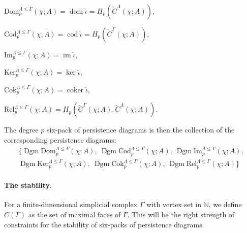 \documentclass[8pt,a4paper,oneside,english,english]{article}
\theoremstyle{plain}
\theoremstyle
{plain}
\theoremstyle{definition}
\newcommand{\N}{\mathbb{N}}
\newcommand{\sixPackPersistenceModule}[6]{{#6}_{#5}^{{#3}\leq{#4}}({#2};{#1})}
\newcommand{\Dom}[5]{\sixPackPersistenceModule{#1}{#2}{#3}{#4}{#5}{\mathrm{Dom}}}
\newcommand{\Cod}[5]{\sixPackPersistenceModule{#1}{#2}{#3}{#4}{#5}{\mathrm{Cod}}}
\newcommand{\Img}[5]{\sixPackPersistenceModule{#1}{#2}{#3}{#4}{#5}{\mathrm{Im}}}
\newcommand{\Ker}[5]{\sixPackPersistenceModule{#1}{#2}{#3}{#4}{#5}{\mathrm{Ker}}}
\newcommand{\Cok}[5]{\sixPackPersistenceModule{#1}{#2}{#3}{#4}{#5}{\mathrm{Cok}}}
\newcommand{\Rel}[5]{\sixPackPersistenceModule{#1}{#2}{#3}{#4}{#5}{\mathrm{Rel}}}
\DeclareMathOperator{\im}{im}
\DeclareMathOperator{\dom}{dom}
\DeclareMathOperator{\codom}{cod}
\DeclareMathOperator{\coker}{coker}
\DeclareMathOperator{\Dgm}{Dgm}
\begin{document}
\smallskip
\begin{compactenum}[-]
    \item $\Dom{A}{\chi}{\Lambda}{\Gamma}{p} = \dom \hat\iota = H_p(\check{C}^\Lambda(\chi; A))$,

    \item $\Cod{A}{\chi}{\Lambda}{\Gamma}{p} = \codom \hat\iota = H_p(\check{C}^\Gamma(\chi; A))$,

    \item $\Img{A}{\chi}{\Lambda}{\Gamma}{p} = \im \hat\iota$,

    \item $\Ker{A}{\chi}{\Lambda}{\Gamma}{p} = \ker \hat\iota$,

    \item $\Cok{A}{\chi}{\Lambda}{\Gamma}{p} = \coker \hat\iota$,

    \item $\Rel{A}{\chi}{\Lambda}{\Gamma}{p} = H_p(\check{C}^\Gamma(\chi; A), \check{C}^\Lambda(\chi; A))$.
\end{compactenum}
The degree $p$ six-pack of persistence diagrams is then the collection of the corresponding persistence diagrams:
\begin{multline*}
    \{
        \Dgm \Dom{A}{\chi}{\Lambda}{\Gamma}{p},\ 
        \Dgm \Cod{A}{\chi}{\Lambda}{\Gamma}{p},\ 
        \Dgm \Img{A}{\chi}{\Lambda}{\Gamma}{p},\  \\
        \Dgm \Ker{A}{\chi}{\Lambda}{\Gamma}{p},\ 
        \Dgm \Cok{A}{\chi}{\Lambda}{\Gamma}{p},\ 
        \Dgm \Rel{A}{\chi}{\Lambda}{\Gamma}{p}
    \}
\end{multline*}

\paragraph{The stability.} For a finite-dimensional simplicial complex $\Gamma$ with vertex set in $\N$, we define $C(\Gamma)$ as the set of maximal faces of $\Gamma$. This will be the right strength of constraints for the stability of six-packs of persistence diagrams.
\end{document}
